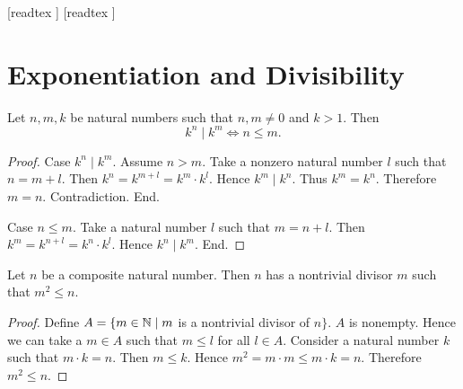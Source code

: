 \documentclass[10pt]{article}
\begin{document}
  \begin{imports}
    \begin{forthel}
      [readtex ]
      [readtex ]
    \end{forthel}
  \end{imports}


  \section{Exponentiation and Divisibility}

  \begin{forthel}
    \begin{proposition}
      Let $n, m, k$ be natural numbers such that $n, m \neq 0$ and $k > 1$.
      Then \[ k^{n} \mid k^{m} \iff n \leq m. \]
    \end{proposition}
    \begin{proof}
      Case $k^{n} \mid k^{m}$.
        Assume $n > m$.
        Take a nonzero natural number $l$ such that $n = m + l$.
        Then $k^{n}
          = k^{m + l}
          = k^{m} \cdot k^{l}$.
        Hence $k^{m} \mid k^{n}$.
        Thus $k^{m} = k^{n}$.
        Therefore $m = n$.
        Contradiction.
      End.
  
      Case $n \leq m$.
        Take a natural number $l$ such that $m = n + l$.
        Then $k^{m}
          = k^{n + l}
          = k^{n} \cdot k^{l}$.
        Hence $k^{n} \mid k^{m}$.
      End.
    \end{proof}
  \end{forthel}
  
  \begin{forthel}
    \begin{proposition}
      Let $n$ be a composite natural number.
      Then $n$ has a nontrivial divisor $m$ such that $m^{2} \leq n$.
    \end{proposition}
    \begin{proof}
      Define $A = \{ m \in \mathbb{N} \mid m$ is a nontrivial divisor of $n \}$.
      $A$ is nonempty.
      Hence we can take a $m \in A$ such that $m \leq l$ for all $l \in A$.
      Consider a natural number $k$ such that $m \cdot k = n$.
      Then $m \leq k$.
      Hence $m^{2} = m \cdot m \leq m \cdot k = n$.
      Therefore $m^{2} \leq n$.
    \end{proof}
  \end{forthel}
\end{document}
